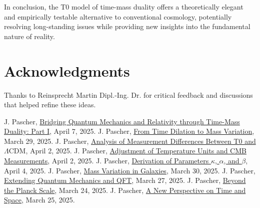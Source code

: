 \documentclass[12pt,a4paper]{article}
\newenvironment{acknowledgments}{\section*{Acknowledgments}}{\vspace{1em}}
\newcommand{\LCDM}{\Lambda\text{CDM}}
\begin{document}
	In conclusion, the T0 model of time-mass duality offers a theoretically elegant and empirically testable alternative to conventional cosmology, potentially resolving long-standing issues while providing new insights into the fundamental nature of reality.
	
	\begin{acknowledgments}
		Thanks to Reinsprecht Martin Dipl.-Ing. Dr. for critical feedback and discussions that helped refine these ideas.
	\end{acknowledgments}
	
	\clearpage  %
	
	\begin{thebibliography}{99}
		 J. Pascher, \href{https://github.com/jpascher/T0-Time-Mass-Duality/tree/main/2/pdf/English/QMRelTimeMassPart1ZEn.pdf}{Bridging Quantum Mechanics and Relativity through Time-Mass Duality: Part I}, April 7, 2025.
		 J. Pascher, \href{https://github.com/jpascher/T0-Time-Mass-Duality/tree/main/2/pdf/English/MathZeitMasseLagrange.pdf}{From Time Dilation to Mass Variation}, March 29, 2025.
		 J. Pascher, \href{https://github.com/jpascher/T0-Time-Mass-Duality/tree/main/2/pdf/English/MessdifferenzenT0StandardEn.pdf}{Analysis of Measurement Differences Between T0 and \(\LCDM\)}, April 2, 2025.
		 J. Pascher, \href{https://github.com/jpascher/T0-Time-Mass-Duality/tree/main/2/pdf/English/TempEinheitenCMBEn.pdf}{Adjustment of Temperature Units and CMB Measurements}, April 2, 2025.
		 J. Pascher, \href{https://github.com/jpascher/T0-Time-Mass-Duality/tree/main/2/pdf/English/ZeitMasseT0ParamsEn.pdf}{Derivation of Parameters \(\kappa\), \(\alpha\), and \(\beta\)}, April 4, 2025.
		 J. Pascher, \href{https://github.com/jpascher/T0-Time-Mass-Duality/tree/main/2/pdf/English/MassVarGalaxienEn.pdf}{Mass Variation in Galaxies}, March 30, 2025.
		 J. Pascher, \href{https://github.com/jpascher/T0-Time-Mass-Duality/tree/main/2/pdf/English/NotwendigkeitQMErweiterungEn.pdf}{Extending Quantum Mechanics and QFT}, March 27, 2025.
		 J. Pascher, \href{https://github.com/jpascher/T0-Time-Mass-Duality/tree/main/2/pdf/English/JenseitsPlanckEn.pdf}{Beyond the Planck Scale}, March 24, 2025.
		 J. Pascher, \href{https://github.com/jpascher/T0-Time-Mass-Duality/tree/main/2/pdf/English/ZeitRaumPascherEn.pdf}{A New Perspective on Time and Space}, March 25, 2025.

\end{thebibliography}
\end{document}
